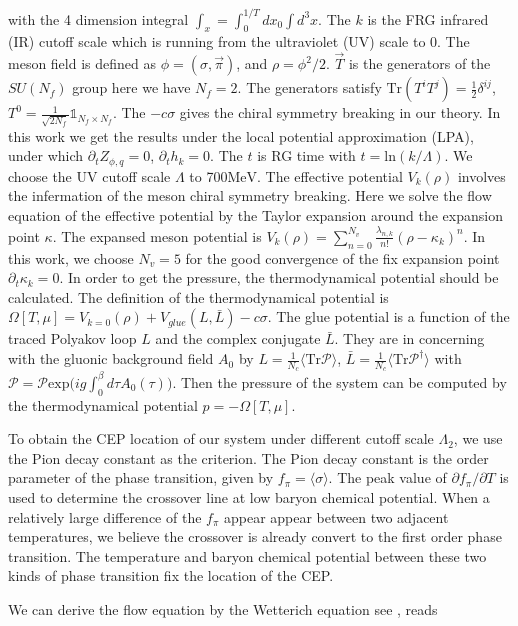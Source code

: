 \documentclass[%
reprint,
superscriptaddress,
showpacs,preprintnumbers,
 amsmath,amssymb,
 aps,
prd,
]{revtex4-1}
\begin{document}
with the 4 dimension integral $\int_x=\int^{1/T}_0dx_0\int d^3x$. The $k$ is the FRG infrared (IR) cutoff scale which is running from the ultraviolet (UV) scale to 0. The meson field is defined as $\phi=(\sigma,\vec{\pi})$, and $\rho=\phi^2/2$. $\vec{T}$ is the generators of the $SU(N_f)$ group here we have $N_f=2$. The generators satisfy $\mathrm{Tr}(T^iT^j)=\frac{1}{2}\delta^{ij}$, $T^0=\frac{1}{\sqrt{2N_f}}\mathbb{1}_{N_f\times N_f}$. The $-c\sigma$ gives the chiral symmetry breaking in our theory. In this work we get the results under the local potential approximation (LPA), under which $\partial_tZ_{\phi,q}=0$, $\partial_t h_k=0$. The $t$ is RG time with $t=\mathrm{ln}(k/\Lambda)$. We choose the UV cutoff scale $\Lambda$ to 700$\mathrm{MeV}$. The effective potential $V_k(\rho)$ involves the infermation of the meson chiral symmetry breaking. Here we solve the flow equation of the effective potential by the Taylor expansion around the expansion point $\kappa$. The expansed meson potential is $V_k(\rho)=\sum^{N_v}_{n=0}\frac{\lambda_{n,k}}{n!}(\rho-\kappa_k)^n$. In this work, we choose $N_v=5$ for the good convergence of the fix expansion point $\partial_t\kappa_k=0$. In order to get the pressure, the thermodynamical potential should be calculated. The definition of the thermodynamical potential is $\Omega[T,\mu]=V_{k=0}(\rho)+V_{glue}(L,\bar{L})-c\sigma$. The glue potential is a function of the traced Polyakov loop $L$ and the complex conjugate $\bar{L}$. They are in concerning with the gluonic background field $A_0$ by $L=\frac{1}{N_c}\langle \mathrm{Tr}\mathcal{P}\rangle$, $\bar{L}=\frac{1}{N_c}\langle \mathrm{Tr}\mathcal{P}^\dagger\rangle$ with $\mathcal{P}=\mathcal{P}\mathrm{exp}\big(ig\int^\beta_0d\tau A_0(\tau)\big)$. Then the pressure of the system can be computed by the thermodynamical potential $p=-\Omega[T,\mu]$.\par To obtain the CEP location of our system under different cutoff scale $\Lambda_2$, we use the Pion decay constant as the criterion. The Pion decay constant is the order parameter of the phase transition, given by $f_{\pi}=\langle \sigma\rangle$. The peak value of $\partial f_\pi/\partial T$ is used to determine the crossover line at low baryon chemical potential. When a relatively large difference of the $f_\pi$ appear appear between two adjacent temperatures, we believe the crossover is already convert to the first order phase transition. The temperature and baryon chemical potential between these two kinds of phase transition fix the location of the CEP.\par We can derive the flow equation by the Wetterich equation see \cite{Wetterich:1992yh}, reads
\end{document}
